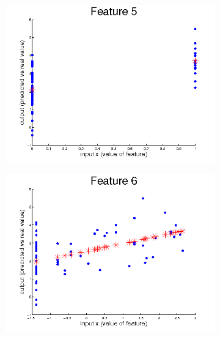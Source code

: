 \documentclass{article}
\begin{document}
	\begin{figure}[H]
	  \begin{subfigure}
	    \centering
	    \includegraphics[scale=0.4,bb=0 0 576 432]{task2-feature5.png}
	  \end{subfigure}
	  \begin{subfigure}
	    \centering
	    \includegraphics[scale=0.4,bb=0 0 576 432]{task2-feature6.png}
	  \end{subfigure}
	\end{figure}
\end{document}
